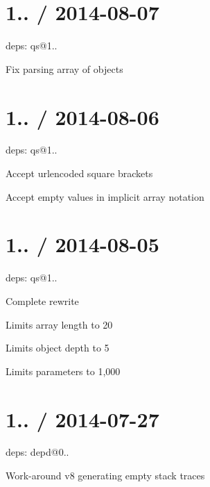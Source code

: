 \section*{1.. / 2014-\/08-\/07 }


\begin{DoxyItemize}
\item deps\+: qs@1..
\begin{DoxyItemize}
\item Fix parsing array of objects
\end{DoxyItemize}
\end{DoxyItemize}

\section*{1.. / 2014-\/08-\/06 }


\begin{DoxyItemize}
\item deps\+: qs@1..
\begin{DoxyItemize}
\item Accept urlencoded square brackets
\item Accept empty values in implicit array notation
\end{DoxyItemize}
\end{DoxyItemize}

\section*{1.. / 2014-\/08-\/05 }


\begin{DoxyItemize}
\item deps\+: qs@1..
\begin{DoxyItemize}
\item Complete rewrite
\item Limits array length to 20
\item Limits object depth to 5
\item Limits parameters to 1,000
\end{DoxyItemize}
\end{DoxyItemize}

\section*{1.. / 2014-\/07-\/27 }


\begin{DoxyItemize}
\item deps\+: depd@0..
\begin{DoxyItemize}
\item Work-\/around v8 generating empty stack traces
\end{DoxyItemize}
\end{DoxyItemize}

